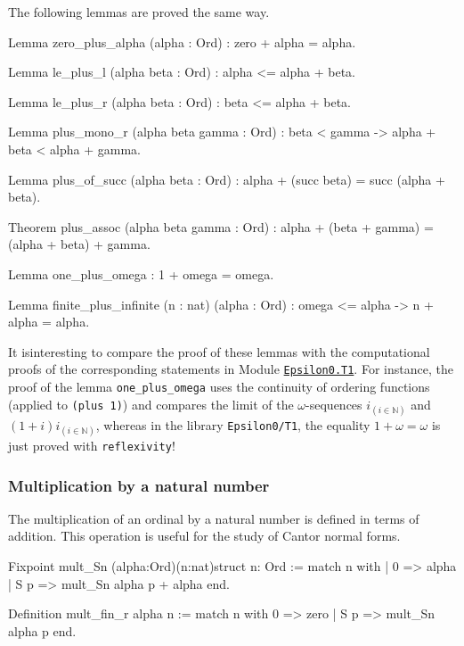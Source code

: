 {The following lemmas are proved the same way.

 \begin{Coqsrc}

Lemma zero_plus_alpha (alpha : Ord) : zero + alpha = alpha.

Lemma le_plus_l (alpha beta : Ord) : alpha <= alpha + beta.

Lemma le_plus_r (alpha beta : Ord) :  beta <= alpha + beta.

Lemma plus_mono_r (alpha beta gamma : Ord) : 
    beta < gamma -> alpha + beta < alpha + gamma.

Lemma plus_of_succ (alpha beta : Ord) :
    alpha + (succ beta) = succ (alpha + beta).

Theorem plus_assoc (alpha beta gamma : Ord) :
  alpha + (beta + gamma) = (alpha + beta) + gamma.

Lemma one_plus_omega :  1 + omega = omega.

Lemma finite_plus_infinite (n : nat) (alpha : Ord) :
  omega <= alpha -> n + alpha = alpha.
\end{Coqsrc} 


It isinteresting to compare the proof of these lemmas with the 
computational proofs of the corresponding statements in Module
\href{../theories/html/hydras.Epsilon0.T1.html}%
{\texttt{Epsilon0.T1}}. 
For instance, the proof of the lemma 
\texttt{one\_plus\_omega} uses the continuity of ordering functions (applied to  \texttt{(plus 1)}) and compares the limit of the $\omega$-sequences $i_{(i \in \mathbb{N})}$ and
$(1+i)i_{(i \in \mathbb{N})}$, whereas in the library  \texttt{Epsilon0/T1}, the equality 
$1+\omega=\omega$ is just proved with \texttt{reflexivity}!



\subsubsection{Multiplication by a natural number}

The multiplication of an ordinal by a natural number is defined in terms of addition.
This operation is useful for the study of Cantor normal forms.

\begin{Coqsrc}
Fixpoint mult_Sn (alpha:Ord)(n:nat){struct n}: Ord :=
 match n with 
            | 0 => alpha
            | S p => mult_Sn  alpha p + alpha
 end.

Definition mult_fin_r alpha n :=
  match n with
      0 => zero
    | S p => mult_Sn alpha p
  end.


\end{Coqsrc}}
